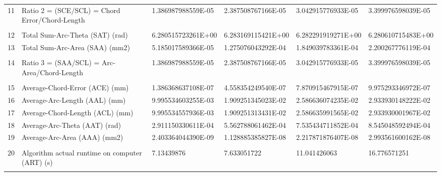 \begin{landscape}
\begin{table}[ht]
{\begin{tabular}{ p{0.2cm} p{8.80cm} p{4.00cm} p{4.0cm} p{4.00cm} p{4.0cm}}
				11	&	Ratio 2 = (SCE/SCL) = Chord Error/Chord-Length	&	1.386987988559E-05	&	2.387508767166E-05	&	3.042915776933E-05	&	3.399976598039E-05	\\
				&		&		&		&		&		\\
				12	&	Total Sum-Arc-Theta (SAT) (rad)	&	6.280515723261E+00	&	6.283169115421E+00	&	6.282291919271E+00	&	6.280610715483E+00	\\
				13	&	Total Sum-Arc-Area (SAA) (mm2)	&	5.185017589366E-05	&	1.275076043292E-04	&	1.849039783361E-04	&	2.200267776119E-04	\\
				&		&		&		&		&		\\
				14	&	Ratio 3 = (SAA/SCL) = Arc-Area/Chord-Length	&	1.386987988559E-05	&	2.387508767166E-05	&	3.042915776933E-05	&	3.399976598039E-05	\\
				&		&		&		&		&		\\
				15	&	Average-Chord-Error (ACE) (mm)	&	1.386368637108E-07	&	4.558354249540E-07	&	7.870915467915E-07	&	9.975293346972E-07	\\
				16	&	Average-Arc-Length (AAL) (mm)	&	9.995534603255E-03	&	1.909251345023E-02	&	2.586636074235E-02	&	2.933930148222E-02	\\
				17	&	Average-Chord-Length (ACL) (mm)	&	9.995534557936E-03	&	1.909251313431E-02	&	2.586635991565E-02	&	2.933930001967E-02	\\
				18	&	Average-Arc-Theta (AAT) (rad)	&	2.911150330611E-04	&	5.562788061462E-04	&	7.535434711852E-04	&	8.545048592494E-04	\\
				19	&	Average-Arc-Area (AAA) (mm2)	&	2.403364044390E-09	&	1.128885385827E-08	&	2.217871876407E-08	&	2.993561600162E-08	\\
				&		&		&		&		&		\\
				20	&	Algorithm actual runtime on computer (ART) (s) 	&	7.13439876	&	7.633051722	&	11.041426063	&	16.776571251	\\
				&		&		&		&		&	\\	
\hline				
\end{tabular}
			
}   %

\end{table}
\end{landscape}

\clearpage
\pagebreak
